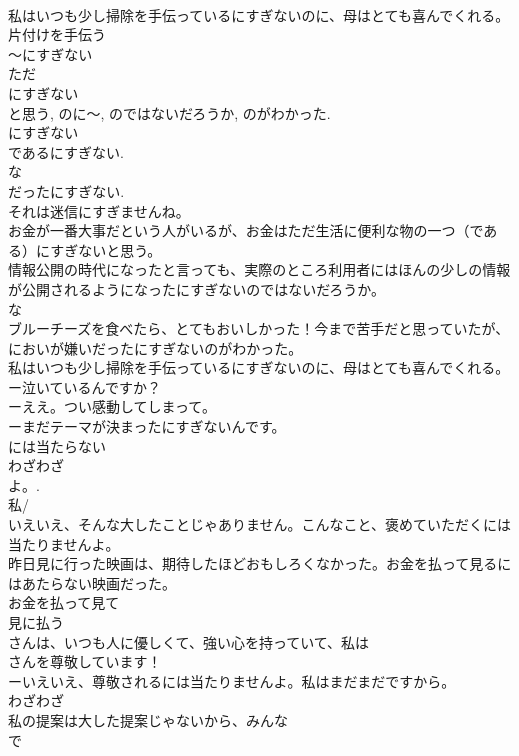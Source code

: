 \documentclass[8pt]{extreport}
\begin{document}
\begin{CJK}{UTF8}{min}
\\	私はいつも少し掃除を手伝っているにすぎないのに、母はとても喜んでくれる。
\\	片付けを手伝う
\\	～にすぎない
\\	ただ 
\\	にすぎない 
\\	と思う, のに～, のではないだろうか, のがわかった. 
\\	にすぎない 
\\	であるにすぎない. 
\\	な
\\	だったにすぎない. 
\\	それは迷信にすぎませんね。
\\	お金が一番大事だという人がいるが、お金はただ生活に便利な物の一つ（である）にすぎないと思う。
\\	情報公開の時代になったと言っても、実際のところ利用者にはほんの少しの情報が公開されるようになったにすぎないのではないだろうか。
\\	な
\\	ブルーチーズを食べたら、とてもおいしかった！今まで苦手だと思っていたが、においが嫌いだったにすぎないのがわかった。
\\	私はいつも少し掃除を手伝っているにすぎないのに、母はとても喜んでくれる。
\\	ー泣いているんですか？
\\	ーええ。つい感動してしまって。
\\	ーまだテーマが決まったにすぎないんです。
\\	には当たらない
\\	わざわざ 
\\	よ。.
\\	私/
\\	いえいえ、そんな大したことじゃありません。こんなこと、褒めていただくには当たりませんよ。
\\	昨日見に行った映画は、期待したほどおもしろくなかった。お金を払って見るにはあたらない映画だった。
\\	お金を払って見て
\\	見に払う
\\	さんは、いつも人に優しくて、強い心を持っていて、私は
\\	さんを尊敬しています！
\\	ーいえいえ、尊敬されるには当たりませんよ。私はまだまだですから。
\\	わざわざ 
\\	私の提案は大した提案じゃないから、みんな
\\	で

\end{CJK}
\end{document}

